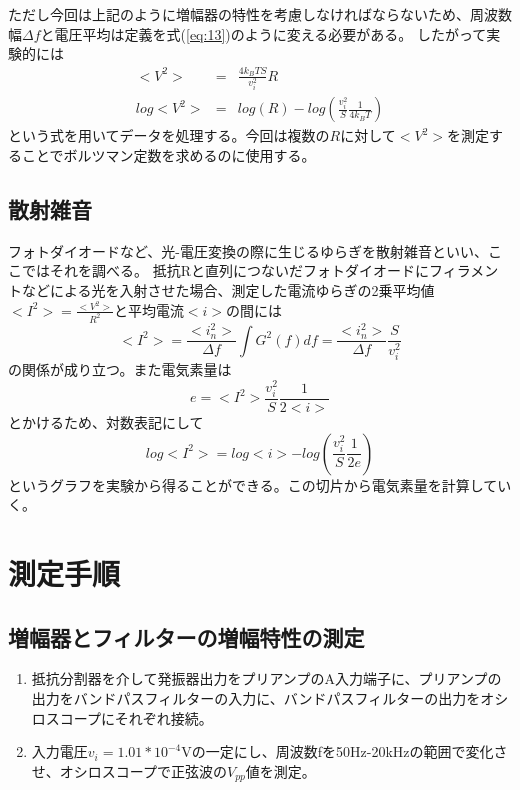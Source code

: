 \documentclass[11pt,a4j]{jsarticle}
\begin{document}
   ただし今回は上記のように増幅器の特性を考慮しなければならないため、周波数幅$\Delta f$と電圧平均は定義を式(\ref{eq:13})のように変える必要がある。
   したがって実験的には
   \begin{eqnarray}
   <V^2> &=& \frac{4k_B TS}{v_i^2} R \label{eq:18} \\
   log<V^2> &=& log(R) - log(\frac{v_i^2}{S} \frac{1}{4k_B T}) \label{eq:17}
   \end{eqnarray}
   という式を用いてデータを処理する。今回は複数の$R$に対して$<V^2>$を測定することでボルツマン定数を求めるのに使用する。
   
   \subsection{散射雑音}
   
   フォトダイオードなど、光-電圧変換の際に生じるゆらぎを散射雑音といい、ここではそれを調べる。
   抵抗Rと直列につないだフォトダイオードにフィラメントなどによる光を入射させた場合、測定した電流ゆらぎの2乗平均値$<I^2> = \frac{<V^2>}{R^2}$と平均電流$<i>$の間には
   \begin{equation}
   <I^2> = \frac{<i_n^2>}{\Delta f} \int G^2 (f) df = \frac{<i_n^2>}{\Delta f} \frac{S}{v_i^2}
   \end{equation}
   の関係が成り立つ。また電気素量は
   \begin{equation}
   e = <I^2> \frac{v_i^2}{S} \frac{1}{2<i>}
   \label{eq:19}
   \end{equation}
   とかけるため、対数表記にして
   \begin{equation}
   log<I^2> = log<i> - log(\frac{v_i^2}{S} \frac{1}{2e})
   \label{eq:20}
   \end{equation}
   というグラフを実験から得ることができる。この切片から電気素量を計算していく。
   
  
 \section{測定手順}
   \subsection{増幅器とフィルターの増幅特性の測定}
   \begin{enumerate}
   \item 抵抗分割器を介して発振器出力をプリアンプのA入力端子に、プリアンプの出力をバンドパスフィルターの入力に、バンドパスフィルターの出力をオシロスコープにそれぞれ接続。
   \item 入力電圧$v_i = 1.01 * 10^{-4}$Vの一定にし、周波数fを50Hz-20kHzの範囲で変化させ、オシロスコープで正弦波の$V_{pp}$値を測定。
   \end{enumerate}
   
\end{document}
